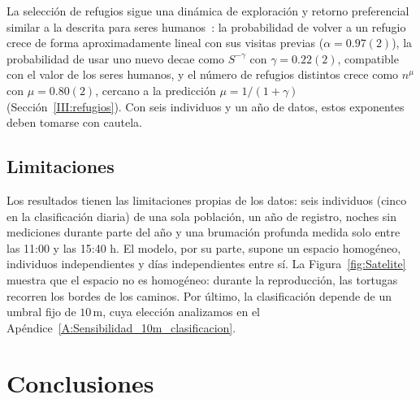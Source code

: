 La selección de refugios sigue una dinámica de exploración y retorno preferencial similar a la descrita para seres humanos~\cite{song2010modeling}: la
probabilidad de volver a un refugio crece de forma aproximadamente lineal con sus visitas previas ($\alpha = 0.97(2)$), la probabilidad de usar uno
nuevo decae como $S^{-\gamma}$ con $\gamma = 0.22(2)$, compatible con el valor de los seres humanos, y el número de refugios distintos crece como
$n^{\mu}$ con $\mu = 0.80(2)$, cercano a la predicción $\mu = 1/(1+\gamma)$ (Sección~\ref{III:refugios}). Con seis individuos y un año de datos, estos
exponentes deben tomarse con cautela.

\subsection{Limitaciones}

Los resultados tienen las limitaciones propias de los datos: seis individuos (cinco en la clasificación diaria) de una sola población, un año de registro,
noches sin mediciones durante parte del año y una brumación profunda medida solo entre las 11:00 y las 15:40 h. El modelo, por su parte, supone un
espacio homogéneo, individuos independientes y días independientes entre sí. La Figura~\ref{fig:Satelite} muestra que el espacio no es homogéneo: durante
la reproducción, las tortugas recorren los bordes de los caminos. Por último, la clasificación depende de un umbral fijo de $10\,\mathrm{m}$, cuya
elección analizamos en el Apéndice~\ref{A:Sensibilidad_10m_clasificacion}.

\section{Conclusiones}\label{IV:conclusiones}

